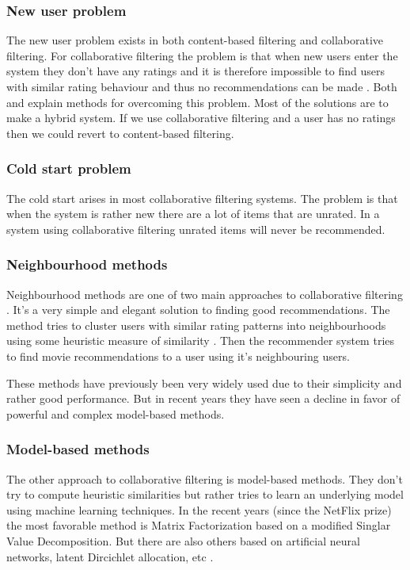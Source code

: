 \documentclass[a4paper,11pt]{article}
\begin{document}
\subsubsection{New user problem}
The new user problem exists in both content-based filtering and collaborative filtering. For collaborative filtering the problem is that when new users enter the system they don't have any ratings and it is therefore impossible to find users with similar rating behaviour and thus no recommendations can be made \cite{1423975}. Both \cite{1423975} and \cite{springerlink:10.1007/978-0-387-85820-3_1} explain methods for overcoming this problem. Most of the solutions are to make a hybrid system. If we use collaborative filtering and a user has no ratings then we could revert to content-based filtering.

\subsubsection{Cold start problem}
The cold start arises in most collaborative filtering systems. The problem is that when the system is rather new there are a lot of items that are unrated. In a system using collaborative filtering unrated items will never be recommended.

\subsubsection{Neighbourhood methods}
Neighbourhood methods are one of two main approaches to collaborative filtering \cite{factorin}.
It's a very simple and elegant solution to finding good recommendations. The method tries to cluster
users with similar rating patterns into neighbourhoods using some heuristic measure of similarity \cite{springerlink:10.1007/978-0-387-85820-3_1}.
Then the recommender system tries to find movie recommendations to a user using it's neighbouring users.

These methods have previously been very widely used due to their simplicity and rather good performance.
But in recent years they have seen a decline in favor of powerful and complex model-based methods.

\subsubsection{Model-based methods}
The other approach to collaborative filtering is model-based methods. They don't try to compute heuristic similarities
but rather tries to learn an underlying model using machine learning techniques. In the recent years (since the NetFlix prize)
the most favorable method is Matrix Factorization based on a modified Singlar Value Decomposition. But there are also others based on artificial neural networks, latent Dircichlet allocation, etc \cite{factorin}\cite{springerlink:10.1007/978-0-387-85820-3_1}.
\end{document}
